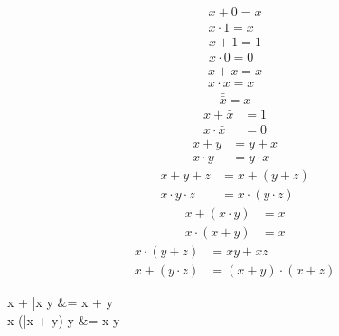 
        \begin{align*}
            x + 0 = x \\
            x \cdot 1 = x
        \end{align*}
        \begin{align*}
            x + 1 = 1 \\
            x \cdot 0 = 0
        \end{align*}
        \begin{align*}
            x + x = x \\
            x \cdot x = x
        \end{align*}
        \begin{align*}
            \bar{\bar{x}} = x
        \end{align*}
        \begin{align*}
            x + \bar{x} &= 1 \\
            x \cdot \bar{x} &= 0
        \end{align*}
        \begin{align*}
            x + y &= y + x \\
            x \cdot y &= y \cdot x
        \end{align*}
        \begin{align*}
            x + y + z &= x + (y + z) \\
            x \cdot y \cdot z &= x \cdot (y \cdot z)
        \end{align*}
        \begin{align*}
            x + (x \cdot y) &= x \\
            x \cdot (x + y) &= x
        \end{align*}
        \begin{align*}
            x \cdot (y + z) &= xy + xz \\
            x + (y \cdot z) &= (x + y) \cdot (x + z)
        \end{align*}
        \begin{eqbox}
            x + \bar{x} \cdot y &= x + y \\
            x \cdot (\bar{x} + y) \cdot y &= x \cdot y
        \end{eqbox}
